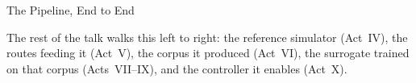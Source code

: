 \begin{frame}{The Pipeline, End to End}
  \vspace{1.0em}
  \centering

  \vspace{1.6em}
  \begin{minipage}{0.90\textwidth}\small
    The rest of the talk walks this left to right: the reference simulator
    (Act~IV), the routes feeding it (Act~V), the corpus it produced (Act~VI),
    the surrogate trained on that corpus (Acts~VII--IX), and the controller it
    enables (Act~X).
  \end{minipage}
\end{frame}
